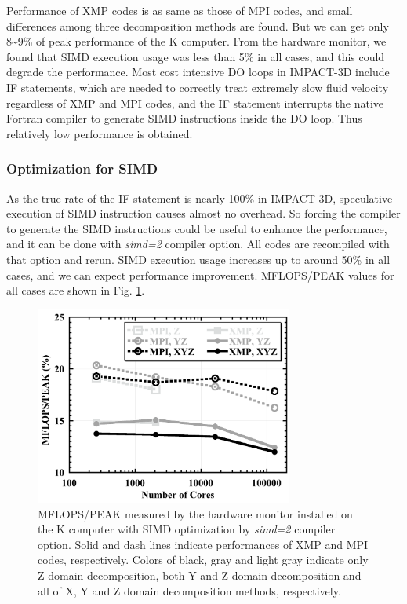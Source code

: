 \documentclass[graybox]{svmult}
\begin{document}
Performance of XMP codes is as same as those of MPI codes, and small differences among three decomposition methods are found. But we can get only 8\textasciitilde 9\% of peak performance of the K computer. From the hardware monitor, we found that SIMD execution usage was less than 5\% in all cases, and this could degrade the performance. Most cost intensive DO loops in IMPACT-3D include IF statements, which are needed to correctly treat extremely slow fluid velocity regardless of XMP and MPI codes, and the IF statement interrupts the native Fortran compiler to generate SIMD instructions inside the DO loop. Thus relatively low performance is obtained. 

\subsubsection{Optimization for SIMD}
As the true rate of the IF statement is nearly 100\% in IMPACT-3D, speculative execution of SIMD instruction causes almost no overhead. So forcing the compiler to generate the SIMD instructions could be useful to enhance the performance, and it can be done with {\it simd=2} compiler option. All codes are recompiled with that option and rerun. SIMD execution usage increases up to around 50\% in all cases, and we can expect performance improvement. MFLOPS/PEAK values for all cases are shown in Fig. \ref{fig6-3}.

\begin{figure}[h]
\begin{center}
\includegraphics[width=8.5cm,bb=0 0 459 352]{fig6-3.png}
\end{center}
\caption{MFLOPS/PEAK measured by the hardware monitor installed on the K computer with SIMD optimization by {\it simd=2} compiler option. Solid and dash lines indicate performances of  XMP and MPI codes, respectively. Colors of black, gray and light gray indicate only Z domain decomposition, both Y and Z domain decomposition and all of X, Y and Z domain decomposition methods, respectively.}
\label{fig6-3} 
\end{figure}
\end{document}
